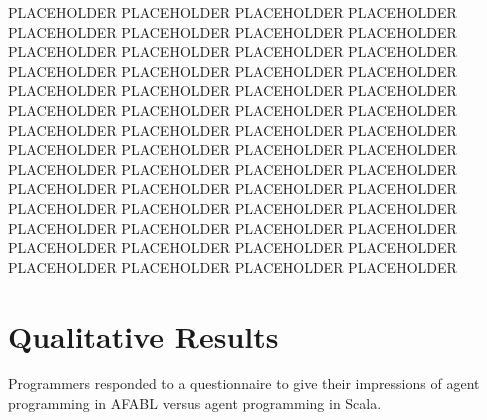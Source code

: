 PLACEHOLDER PLACEHOLDER PLACEHOLDER PLACEHOLDER PLACEHOLDER PLACEHOLDER PLACEHOLDER PLACEHOLDER PLACEHOLDER PLACEHOLDER PLACEHOLDER PLACEHOLDER PLACEHOLDER PLACEHOLDER PLACEHOLDER PLACEHOLDER PLACEHOLDER PLACEHOLDER PLACEHOLDER PLACEHOLDER PLACEHOLDER PLACEHOLDER PLACEHOLDER PLACEHOLDER PLACEHOLDER PLACEHOLDER PLACEHOLDER PLACEHOLDER PLACEHOLDER PLACEHOLDER PLACEHOLDER PLACEHOLDER PLACEHOLDER PLACEHOLDER PLACEHOLDER PLACEHOLDER PLACEHOLDER PLACEHOLDER PLACEHOLDER PLACEHOLDER PLACEHOLDER PLACEHOLDER PLACEHOLDER PLACEHOLDER PLACEHOLDER PLACEHOLDER PLACEHOLDER PLACEHOLDER PLACEHOLDER PLACEHOLDER PLACEHOLDER PLACEHOLDER PLACEHOLDER PLACEHOLDER PLACEHOLDER PLACEHOLDER

\section{Qualitative Results}

Programmers responded to a questionnaire to give their impressions of agent programming in AFABL versus agent programming in Scala.

